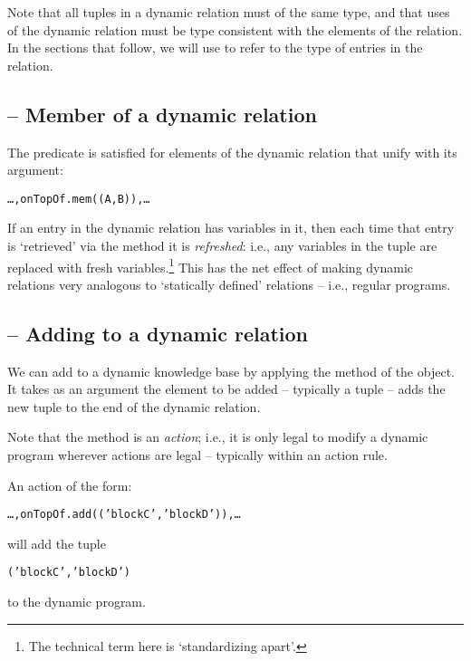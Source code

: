 Note that all tuples in a dynamic relation must of the same type, and that uses of the dynamic relation must be type consistent with the elements of the relation. In the sections that follow, we will use  to refer to the type of entries in the  relation.

\subsection{ -- Member of a dynamic relation}
\label{dynamic:invoke}
The  predicate is satisfied for elements of the dynamic relation that unify with its argument: 
\begin{alltt}
\ldots,onTopOf.mem((A,B)),\ldots
\end{alltt}
If an entry in the dynamic relation has variables in it, then each time that entry is `retrieved' via the  method it is \emph{refreshed}: i.e., any variables in the tuple are replaced with fresh variables.\footnote{The technical term here is `standardizing apart'.} This has the net effect of making dynamic relations very analogous to `statically defined' relations -- i.e., regular programs.

\subsection{ -- Adding to a dynamic relation}
\label{dynamic:add}
We can add to a dynamic knowledge base by applying the  method of the  object. It takes as an argument the element to be added -- typically a tuple --  adds the new tuple to the end of the dynamic relation.

Note that the  method is an \emph{action}; i.e., it is only legal to modify a dynamic program wherever actions are legal -- typically within an action rule.

An action of the form:
\begin{alltt}
\ldots,onTopOf.add(('blockC','blockD')),\ldots
\end{alltt}
will add the tuple
\begin{alltt}
('blockC','blockD')
\end{alltt}
to the  dynamic program.

